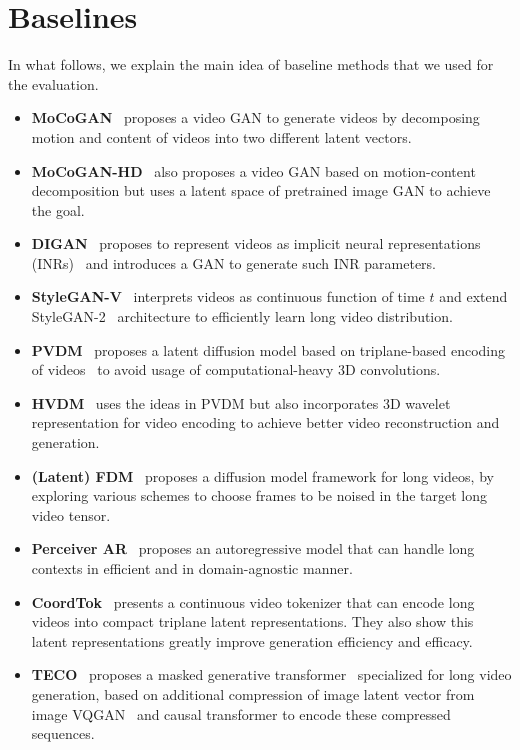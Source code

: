 \section{Baselines}
\label{appen:baselines}
In what follows, we explain the main idea of baseline methods that we used for the evaluation.
\begin{itemize}[leftmargin=0.2in]
\item \textbf{MoCoGAN}~\citep{tulyakov2018mocogan} proposes a video GAN to generate videos by decomposing motion and content of videos into two different latent vectors.
\item \textbf{MoCoGAN-HD}~\citep{tian2021good} also proposes a video GAN based on motion-content decomposition but uses a latent space of pretrained image GAN to achieve the goal.
\item \textbf{DIGAN}~\citep{yu2022digan} proposes to represent videos as implicit neural representations (INRs)~\citep{sitzmann2020implicit} and introduces a GAN to generate such INR parameters.
\item \textbf{StyleGAN-V}~\citep{skorokhodov2021stylegan} interprets videos as continuous function of time $t$ and extend StyleGAN-2~\citep{karras2020analyzing} architecture to efficiently learn long video distribution.
\item \textbf{PVDM}~\citep{yu2023video} proposes a latent diffusion model based on triplane-based encoding of videos~\citep{kim2022scalable} to avoid usage of computational-heavy 3D convolutions.
\item \textbf{HVDM}~\citep{kim2024hybrid} uses the ideas in PVDM but also incorporates 3D wavelet representation for video encoding to achieve better video reconstruction and generation.
\item \textbf{(Latent) FDM}~\citep{harvey2022flexible} proposes a diffusion model framework for long videos, by exploring various schemes to choose frames to be noised in the target long video tensor.
\item \textbf{Perceiver AR}~\citep{hawthorne2022general} proposes an autoregressive model that can handle long contexts in efficient and in domain-agnostic manner.
\item \textbf{CoordTok}~\citep{jang2024efficient} presents a continuous video tokenizer that can encode long videos into compact triplane latent representations. They also show this latent representations greatly improve generation efficiency and efficacy.
\item \textbf{TECO}~\citep{yan2023temporally} proposes a masked generative transformer~\citep{chang2022maskgit} specialized for long video generation, based on additional compression of image latent vector from image VQGAN~\citep{yu2022vectorquantized} and causal transformer to encode these compressed sequences.
\end{itemize}